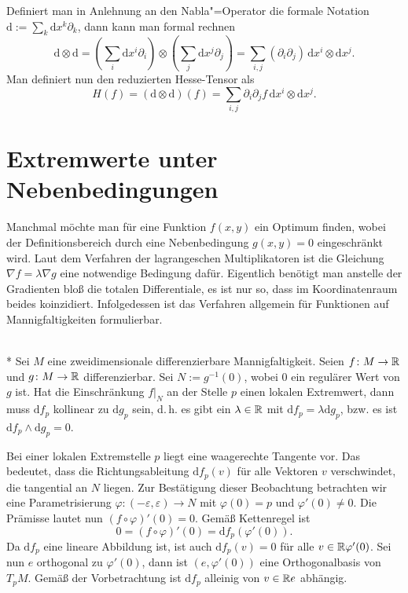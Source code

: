 Definiert man in Anlehnung an den Nabla"=Operator die formale Notation
$\mathrm d := \sum_k\mathrm dx^k\partial_k$,
dann kann man formal rechnen%
\begin{equation}\textstyle
\mathrm d\otimes\mathrm d
= (\sum_i\mathrm dx^i\partial_i)\otimes(\sum_j\mathrm dx^j\partial_j)
= \sum_{i,j} (\partial_i\partial_j)\,\mathrm dx^i\otimes\mathrm dx^j.
\end{equation}
Man definiert nun den reduzierten Hesse-Tensor als%
\begin{equation}\textstyle
H(f) = (\mathrm d\otimes\mathrm d)(f)
= \sum_{i,j} \partial_i\partial_j f\,\mathrm dx^i\otimes\mathrm dx^j.
\end{equation}

\newpage
\section{Extremwerte unter Nebenbedingungen}

Manchmal möchte man für eine Funktion $f(x,y)$ ein Optimum finden,
wobei der Definitionsbereich durch eine Nebenbedingung $g(x,y)=0$
eingeschränkt wird. Laut dem Verfahren der lagrangeschen
Multiplikatoren ist die Gleichung $\nabla f = \lambda\nabla g$
eine notwendige Bedingung dafür. Eigentlich benötigt man anstelle
der Gradienten bloß die totalen Differentiale, es ist nur so, dass
im Koordinatenraum beides koinzidiert. Infolgedessen ist das
Verfahren allgemein für Funktionen auf Mannigfaltigkeiten
formulierbar.

\begin{theorem}\mbox{}\\*
Sei $M$ eine zweidimensionale differenzierbare Mannigfaltigkeit.
Seien $f\colon M\to\mathbb R$ und $g\colon M\to\mathbb R$
differenzierbar. Sei $N:=g^{-1}(0)$, wobei 0 ein regulärer Wert 
von $g$ ist. Hat die Einschränkung $f|_N$ an der Stelle $p$ einen
lokalen Extremwert, dann muss $\mathrm df_p$ kollinear zu
$\mathrm dg_p$ sein, d.\,h. es gibt ein $\lambda\in\mathbb R$ mit
$\mathrm df_p = \lambda\mathrm dg_p$, bzw. es ist
$\mathrm df_p\land\mathrm dg_p=0$.
\end{theorem}
\noindent{}
Bei einer lokalen Extremstelle $p$ liegt eine waagerechte Tangente vor.
Das bedeutet, dass die Richtungsableitung $\mathrm df_p(v)$ für alle
Vektoren $v$ verschwindet, die tangential an $N$ liegen. Zur
Bestätigung dieser Beobachtung betrachten wir eine Parametrisierung
$\varphi\colon (-\varepsilon,\varepsilon) \to N$ mit
$\varphi(0)=p$ und $\varphi'(0)\ne 0$. Die Prämisse lautet nun
$(f\circ\varphi)'(0)=0$. Gemäß Kettenregel ist
\begin{equation}
0 = (f\circ\varphi)'(0) =  \mathrm df_p(\varphi'(0)).
\end{equation}
Da $\mathrm df_p$ eine lineare Abbildung ist, ist
auch $\mathrm df_p(v)=0$ für alle $v\in\mathbb R\varphi'(0)$.
Sei nun $e$ orthogonal zu $\varphi'(0)$, dann ist
$(e,\varphi'(0))$ eine Orthogonalbasis von $T_p M$. Gemäß der
Vorbetrachtung ist $\mathrm df_p$ alleinig von $v\in\mathbb R e$ abhängig.

